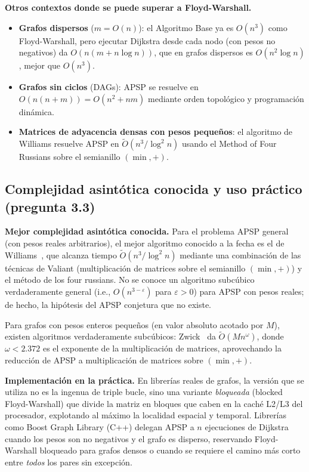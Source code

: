\documentclass[11pt]{article}
\begin{document}
\textbf{Otros contextos donde se puede superar a Floyd-Warshall.}
\begin{itemize}
  \item \textbf{Grafos dispersos} ($m=O(n)$): el Algoritmo Base ya es
  $O(n^3)$ como Floyd-Warshall, pero ejecutar Dijkstra desde cada nodo
  (con pesos no negativos) da $O(n(m+n\log n))$, que en grafos dispersos es
  $O(n^2\log n)$, mejor que $O(n^3)$.
  \item \textbf{Grafos sin ciclos} (DAGs): APSP se resuelve en
  $O(n(n+m))=O(n^2+nm)$ mediante orden topológico y programación dinámica.
  \item \textbf{Matrices de adyacencia densas con pesos pequeños}: el
  algoritmo de Williams \cite{williams2014} resuelve APSP en
  $\tilde{O}(n^3/\log^2 n)$ usando el Method of Four Russians sobre el
  semianillo $(\min,+)$.
\end{itemize}

\subsection{Complejidad asintótica conocida y uso práctico (pregunta 3.3)}

\textbf{Mejor complejidad asintótica conocida.} Para el problema APSP
general (con pesos reales arbitrarios), el mejor algoritmo conocido a la
fecha es el de Williams~\cite{williams2014}, que alcanza tiempo
$\tilde{O}(n^3 / \log^2 n)$ mediante una combinación de las técnicas de
Valiant (multiplicación de matrices sobre el semianillo $(\min,+)$) y el
método de los four russians. No se conoce un algoritmo subcúbico
verdaderamente general (i.e., $O(n^{3-\varepsilon})$ para $\varepsilon>0$)
para APSP con pesos reales; de hecho, la hipótesis del APSP conjetura que no
existe.

Para grafos con pesos enteros pequeños (en valor absoluto acotado por $M$),
existen algoritmos verdaderamente subcúbicos: Zwick~\cite{zwick2002} da
$\tilde{O}(Mn^{\omega})$, donde $\omega<2.372$ es el exponente de la
multiplicación de matrices, aprovechando la reducción de APSP a
multiplicación de matrices sobre $(\min,+)$.

\textbf{Implementación en la práctica.} En librerías reales de grafos, la
versión que se utiliza no es la ingenua de triple bucle, sino una variante
\emph{bloqueada} (blocked Floyd-Warshall) que divide la matriz en bloques
que caben en la caché L2/L3 del procesador, explotando al máximo la localidad
espacial y temporal. Librerías como Boost Graph Library (C++) delegan APSP a
$n$ ejecuciones de Dijkstra cuando los pesos son no negativos y el grafo es
disperso, reservando Floyd-Warshall bloqueado para grafos densos o cuando se
requiere el camino más corto entre \emph{todos} los pares sin excepción.
\end{document}
